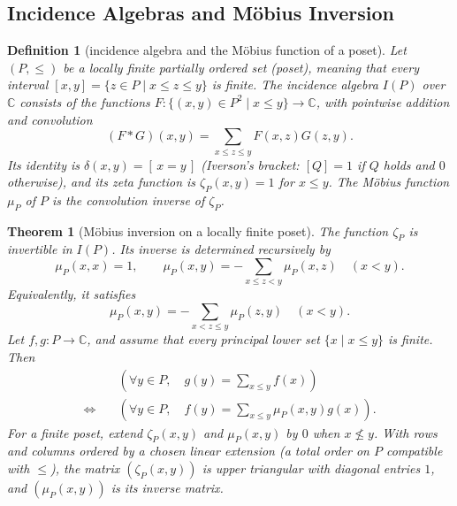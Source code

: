 \documentclass[11pt]{article}
\theoremstyle{ntstyle}
\newtheorem{theorem}{Theorem}[subsection]
\newtheorem{definition}{Definition}[subsection]
\begin{document}
\subsection{Incidence Algebras and M{\"o}bius Inversion}

\begin{definition}[incidence algebra and the M{\"o}bius function of a poset]\label{def:5.4.1} Let $(P,\le)$ be a locally finite partially ordered set (poset), meaning that every interval $[x,y]=\{z\in P \mid x\le z\le y\}$ is finite. The incidence algebra $I(P)$ over $\mathbb{C}$ consists of the functions $F:\{(x,y)\in P^2\mid x\le y\}\to\mathbb{C}$, with pointwise addition and convolution
	\[
		(F*G)(x,y)=\sum_{x\le z\le y}F(x,z)G(z,y).
	\]
	Its identity is $\delta(x,y)=[\,x=y\,]$ (Iverson's bracket: $[Q]=1$ if $Q$ holds and $0$
	otherwise), and its zeta function is $\zeta_P(x,y)=1$ for $x\le y$. The M{\"o}bius function
	$\mu_P$ of $P$ is the convolution inverse of $\zeta_P$.
\end{definition}
\begin{theorem}[M{\"o}bius inversion on a locally finite poset]\label{thm:5.4.1} The function $\zeta_P$ is invertible in $I(P)$. Its inverse is determined recursively by
	\[
		\mu_P(x,x)=1,\qquad
		\mu_P(x,y)=-\sum_{x\le z<y}\mu_P(x,z)\quad(x<y).
	\]
	Equivalently, it satisfies
	\[
		\mu_P(x,y)=-\sum_{x<z\le y}\mu_P(z,y)\quad(x<y).
	\]
	Let $f,g:P\to\mathbb{C}$, and assume that every principal lower set $\{x \mid x\le y\}$ is finite. Then
	\[
		\begin{aligned}
			&\left(\forall y\in P,\quad g(y)=\sum_{x\le y}f(x)\right)\\
			\Longleftrightarrow\quad
			&\left(\forall y\in P,\quad f(y)=\sum_{x\le y}\mu_P(x,y)g(x)\right).
		\end{aligned}
	\]
	For a finite poset, extend $\zeta_P(x,y)$ and $\mu_P(x,y)$ by $0$ when $x\nleq y$. With rows and
	columns ordered by a chosen linear extension (a total order on $P$ compatible with $\le$), the
	matrix $(\zeta_P(x,y))$ is upper triangular with diagonal entries $1$, and $(\mu_P(x,y))$ is its
	inverse matrix.
\end{theorem}
\end{document}

